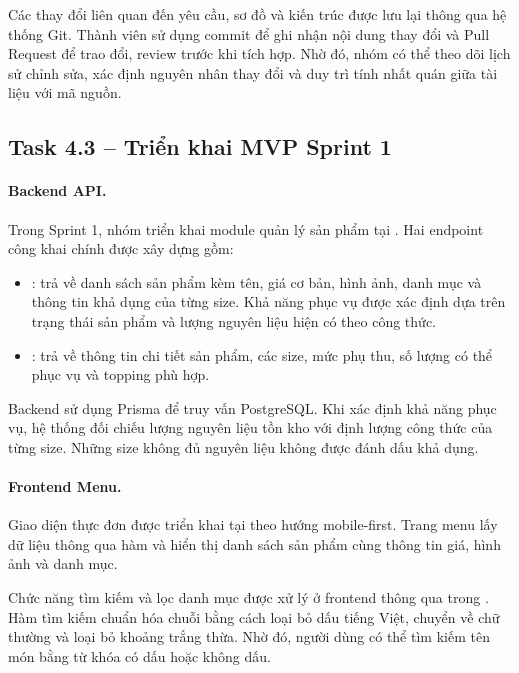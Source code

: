 Các thay đổi liên quan đến yêu cầu, sơ đồ và kiến trúc được lưu lại
thông qua hệ thống Git. Thành viên sử dụng commit để ghi nhận nội dung
thay đổi và Pull Request để trao đổi, review trước khi tích hợp.
Nhờ đó, nhóm có thể theo dõi lịch sử chỉnh sửa, xác định nguyên nhân
thay đổi và duy trì tính nhất quán giữa tài liệu với mã nguồn.

\subsection{Task 4.3 -- Triển khai MVP Sprint 1}

\paragraph{Backend API.}
Trong Sprint 1, nhóm triển khai module quản lý sản phẩm tại
. Hai endpoint công khai chính
được xây dựng gồm:

\begin{itemize}
    \item {}: trả về danh sách sản phẩm kèm tên,
    giá cơ bản, hình ảnh, danh mục và thông tin khả dụng của từng size.
    Khả năng phục vụ được xác định dựa trên trạng thái sản phẩm và
    lượng nguyên liệu hiện có theo công thức.
    \item {}: trả về thông tin chi tiết sản phẩm,
    các size, mức phụ thu, số lượng có thể phục vụ và topping phù hợp.
\end{itemize}

Backend sử dụng Prisma để truy vấn PostgreSQL. Khi xác định khả năng
phục vụ, hệ thống đối chiếu lượng nguyên liệu tồn kho với định lượng
công thức của từng size. Những size không đủ nguyên liệu không được
đánh dấu khả dụng.

\paragraph{Frontend Menu.}
Giao diện thực đơn được triển khai tại
 theo hướng mobile-first.
Trang menu lấy dữ liệu thông qua hàm  và hiển thị
danh sách sản phẩm cùng thông tin giá, hình ảnh và danh mục.

Chức năng tìm kiếm và lọc danh mục được xử lý ở frontend thông qua
 trong .
Hàm tìm kiếm chuẩn hóa chuỗi bằng cách loại bỏ dấu tiếng Việt,
chuyển về chữ thường và loại bỏ khoảng trắng thừa. Nhờ đó, người dùng
có thể tìm kiếm tên món bằng từ khóa có dấu hoặc không dấu.

